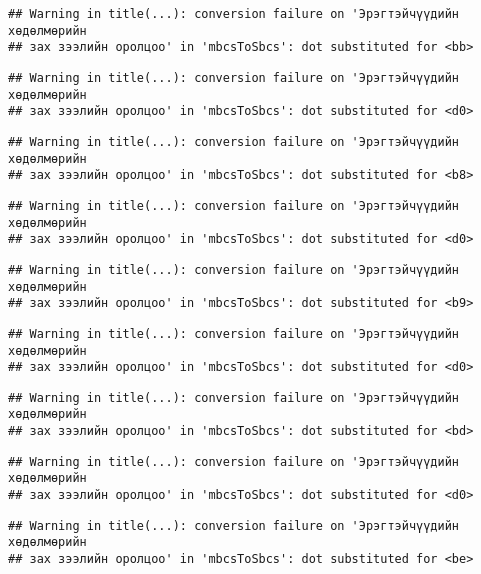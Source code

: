 \documentclass[]{article}
\begin{document}
\begin{verbatim}
## Warning in title(...): conversion failure on 'Эрэгтэйчүүдийн хөдөлмөрийн
## зах зээлийн оролцоо' in 'mbcsToSbcs': dot substituted for <bb>
\end{verbatim}

\begin{verbatim}
## Warning in title(...): conversion failure on 'Эрэгтэйчүүдийн хөдөлмөрийн
## зах зээлийн оролцоо' in 'mbcsToSbcs': dot substituted for <d0>
\end{verbatim}

\begin{verbatim}
## Warning in title(...): conversion failure on 'Эрэгтэйчүүдийн хөдөлмөрийн
## зах зээлийн оролцоо' in 'mbcsToSbcs': dot substituted for <b8>
\end{verbatim}

\begin{verbatim}
## Warning in title(...): conversion failure on 'Эрэгтэйчүүдийн хөдөлмөрийн
## зах зээлийн оролцоо' in 'mbcsToSbcs': dot substituted for <d0>
\end{verbatim}

\begin{verbatim}
## Warning in title(...): conversion failure on 'Эрэгтэйчүүдийн хөдөлмөрийн
## зах зээлийн оролцоо' in 'mbcsToSbcs': dot substituted for <b9>
\end{verbatim}

\begin{verbatim}
## Warning in title(...): conversion failure on 'Эрэгтэйчүүдийн хөдөлмөрийн
## зах зээлийн оролцоо' in 'mbcsToSbcs': dot substituted for <d0>
\end{verbatim}

\begin{verbatim}
## Warning in title(...): conversion failure on 'Эрэгтэйчүүдийн хөдөлмөрийн
## зах зээлийн оролцоо' in 'mbcsToSbcs': dot substituted for <bd>
\end{verbatim}

\begin{verbatim}
## Warning in title(...): conversion failure on 'Эрэгтэйчүүдийн хөдөлмөрийн
## зах зээлийн оролцоо' in 'mbcsToSbcs': dot substituted for <d0>
\end{verbatim}

\begin{verbatim}
## Warning in title(...): conversion failure on 'Эрэгтэйчүүдийн хөдөлмөрийн
## зах зээлийн оролцоо' in 'mbcsToSbcs': dot substituted for <be>
\end{verbatim}
\end{document}
